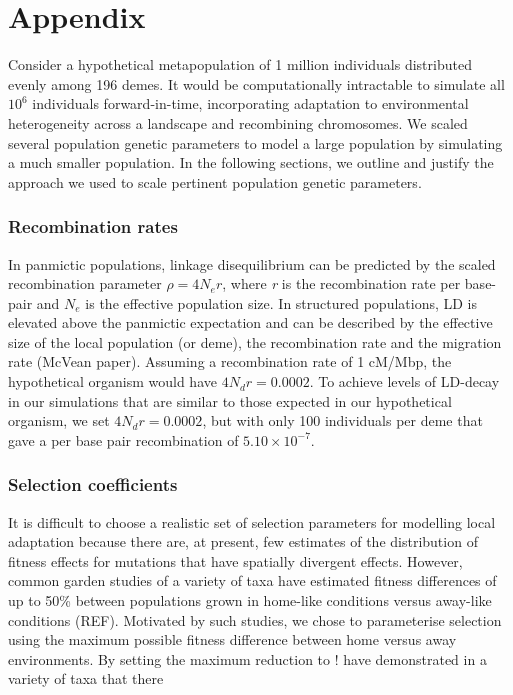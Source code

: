 \documentclass[11pt,twoside,lineno]{GSA_format}
\begin{document}
%


\section{Appendix}


Consider a hypothetical metapopulation of 1 million individuals distributed evenly among 196 demes. It would be computationally intractable to simulate all $10^6$ individuals forward-in-time, incorporating adaptation to environmental heterogeneity across a landscape and recombining chromosomes. We scaled several population genetic parameters to model a large population by simulating a much smaller population. In the following sections, we outline and justify the approach we used to scale pertinent population genetic parameters. 

\subsubsection{Recombination rates}

In panmictic populations, linkage disequilibrium can be predicted by the scaled recombination parameter $\rho = 4N_er$, where \textit{r} is the recombination rate per base-pair and $N_e$ is the effective population size. In structured populations, LD is elevated above the panmictic expectation and can be described by the effective size of the local population (or deme), the recombination rate and the migration rate (McVean paper). Assuming a recombination rate of 1 cM/Mbp, the hypothetical organism would have $4N_dr = 0.0002$. To achieve levels of LD-decay in our simulations that are similar to those expected in our hypothetical organism, we set $4N_dr = 0.0002$, but with only 100 individuals per deme that gave a per base pair recombination of $5.10 \times 10^{-7}$.

\subsubsection{Selection coefficients} 

It is difficult to choose a realistic set of selection parameters for modelling local adaptation because there are, at present, few estimates of the distribution of fitness effects for mutations that have spatially divergent effects. However, common garden studies of a variety of taxa have estimated fitness differences of up to 50\% between populations grown in home-like conditions versus away-like conditions (REF). Motivated by such studies, we chose to parameterise selection using the maximum possible fitness difference between home versus away environments. By setting the maximum reduction to $!$
have demonstrated in a variety of taxa that there 
\end{document}
